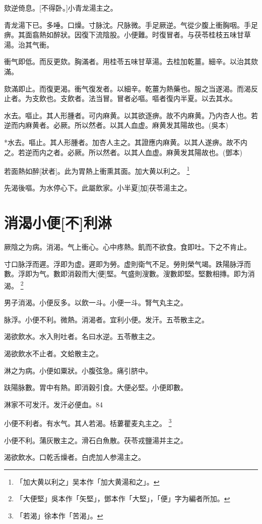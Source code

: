 \documentclass[12pt,oneside,UTF8,b5paper]{ctexbook}她她她她她她她
\begin{document}
欬逆倚息。[不得卧。]小青龙湯主之。

青龙湯下已。多唾。口燥。寸脉沈。尺脉微。手足厥逆。气從少腹上衝胸咽。手足痹。其面翕熱如醉狀。因復下流陰股。小便難。时復冒者。与茯苓桂枝五味甘草湯。治其气衝。

衝气即低。而反更欬。胸滿者。用桂苓五味甘草湯。去桂加乾薑。細辛。以治其欬滿。

欬滿即止。而復更渴。衝气復发者。以細辛。乾薑为熱藥也。服之当遂渴。而渴反止者。为支飲也。支飲者。法当冒。冒者必嘔。嘔者復内半夏。以去其水。

水去。嘔止。其人形腫者。可内麻黄。以其欲逐痹。故不内麻黄。乃内杏人也。若逆而内麻黄者。必厥。所以然者。以其人血虚。麻黄发其陽故也。(吳本)

*水去。嘔止。其人形腫者。加杏人主之。其證應内麻黄。以其人遂痹。故不内之。若逆而内之者。必厥。所以然者。以其人血虚。麻黄发其陽故也。(鄧本)

若面熱如醉[狀者]。此为胃熱上衝熏其面。加大黄以利之。
	\footnote{「加大黄以利之」吴本作「加大黄湯和之」。}

先渴後嘔。为水停心下。此屬飲家。小半夏[加]茯苓湯主之。

\chapter{消渴小便[不]利淋}

厥陰之为病。消渴。气上衝心。心中疼熱。飢而不欲食。食即吐。下之不肯止。

寸口脉浮而遲。浮即为虚。遲即为勞。虚則衛气不足。勞則榮气竭。跌陽脉浮而數。浮即为气。數即消穀而大[便]堅。气盛則溲數。溲數即堅。堅數相摶。即为消渴。
	\footnote{「大便堅」吳本作「矢堅」，鄧本作「大堅」，「便」字为編者所加。}

男子消渴。小便反多。以飲一斗。小便一斗。腎气丸主之。

脉浮。小便不利。微熱。消渴者。宜利小便。发汗。五苓散主之。

渴欲飲水。水入則吐者。名曰水逆。五苓散主之。

渴欲飲水不止者。文蛤散主之。

淋之为病。小便如粟狀。小腹弦急。痛引脐中。

趺陽脉數。胃中有熱。即消穀引食。大便必堅。小便即數。

淋家不可发汗。发汗必便血。84

小便不利者。有水气。其人若渴。栝蔞瞿麦丸主之。
	\footnote{「若渴」徐本作「苦渴」。}

小便不利。蒲灰散主之。滑石白魚散。茯苓戎鹽湯并主之。

渴欲飲水。口乾舌燥者。白虎加人参湯主之。
\end{document}
